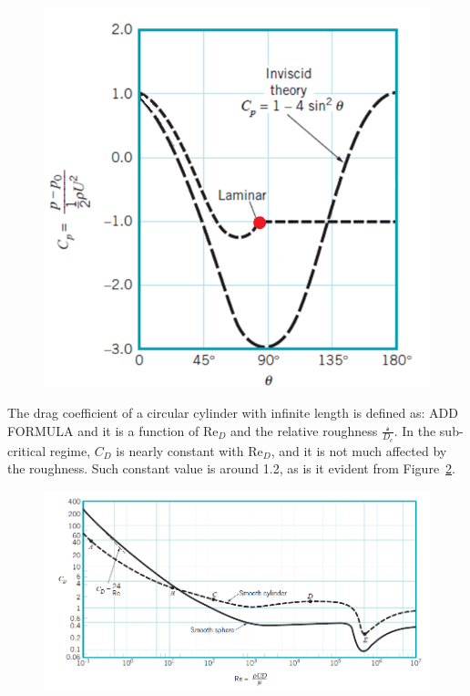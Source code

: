 \documentclass[12pt]{article}
\begin{document}
        \begin{figure}[!ht]
                \includegraphics[width=\textwidth]{Pressure_Distribution.png}
                \centering
                \caption{}
                \label{fig:p_d}
        \end{figure}

        The drag coefficient of a circular cylinder with infinite length is defined as: ADD FORMULA and it is a function of $\text{Re}_D$ and the relative roughness $\frac{\mathcal{s}}{D_c}$. In the sub-critical regime, $C_D$ is nearly constant with $\text{Re}_D$, and it is not much affected by the roughness. Such constant value is around 1.2, as is it evident from Figure~\ref{fig:dragtrend}.

        \begin{figure}[!ht]
                \includegraphics[width=\textwidth]{DragCoefficient_Trend.png}
                \centering
                \caption{}
                \label{fig:dragtrend}
        \end{figure}
\end{document}
